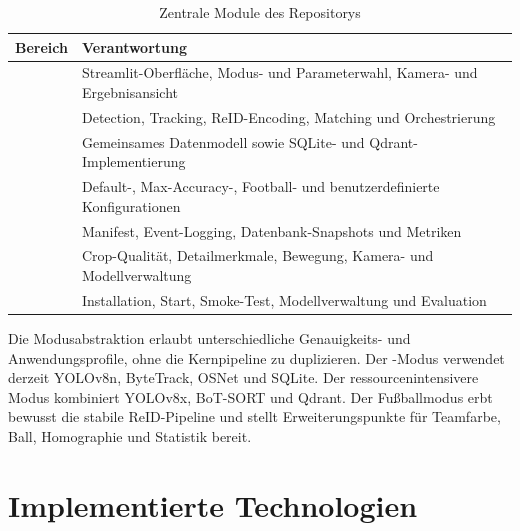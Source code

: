 \begin{table}[H]
  \centering
  \caption{Zentrale Module des Repositorys}
  \label{tab:modules}
  \begin{tabularx}{\textwidth}{L{36mm}Y}
    \toprule
    \textbf{Bereich} & \textbf{Verantwortung} \\
    \midrule
     & Streamlit-Oberfläche, Modus- und Parameterwahl, Kamera- und Ergebnisansicht \\
     & Detection, Tracking, ReID-Encoding, Matching und Orchestrierung \\
     & Gemeinsames Datenmodell sowie SQLite- und Qdrant-Implementierung \\
     & Default-, Max-Accuracy-, Football- und benutzerdefinierte Konfigurationen \\
     & Manifest, Event-Logging, Datenbank-Snapshots und Metriken \\
     & Crop-Qualität, Detailmerkmale, Bewegung, Kamera- und Modellverwaltung \\
     & Installation, Start, Smoke-Test, Modellverwaltung und Evaluation \\
    \bottomrule
  \end{tabularx}
\end{table}

Die Modusabstraktion erlaubt unterschiedliche Genauigkeits- und
Anwendungsprofile, ohne die Kernpipeline zu duplizieren. Der
-Modus verwendet derzeit YOLOv8n, ByteTrack, OSNet und SQLite.
Der ressourcenintensivere Modus kombiniert YOLOv8x, BoT-SORT und Qdrant. Der
Fußballmodus erbt bewusst die stabile ReID-Pipeline und stellt Erweiterungspunkte
für Teamfarbe, Ball, Homographie und Statistik bereit.


\section{Implementierte Technologien}

